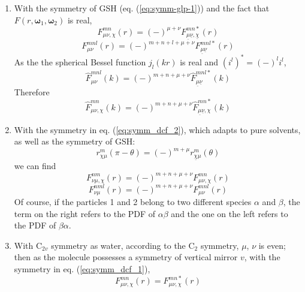 \begin{enumerate}
\item With the symmetry of \acs{GSH} (eq. (\ref{eq:symm-glp-1})) and the
fact that $F(r,\boldsymbol{\omega}_{1},\boldsymbol{\omega}_{2})$
is real,
\begin{equation}
F_{\mu\nu,\chi}^{mn}(r)=\left(-\right)^{\mu+\nu}F_{\underline{\mu}\underline{\nu},\underline{\chi}}^{mn*}(r)
\end{equation}
\begin{equation}
F_{\mu\nu}^{mnl}(r)=\left(-\right)^{m+n+l+\mu+\nu}F_{\underline{\mu}\underline{\nu}}^{mnl*}(r)\label{eq:sym301}
\end{equation}
As the the spherical Bessel function $j_{l}(kr)$ is real and $\left(i^{l}\right)^{*}=\left(-\right)^{l}i^{l}$,
\begin{equation}
\hat{F}_{\mu\nu}^{mnl}(k)=\left(-\right)^{m+n+\mu+\nu}\hat{F}_{\underline{\mu}\underline{\nu}}^{mnl*}(k)\label{eq:rot-invar-symm-k-l}
\end{equation}
Therefore
\begin{equation}
\hat{F}_{\mu\nu,\chi}^{mn}(k)=\left(-\right)^{m+n+\mu+\nu}\hat{F}_{\underline{\mu}\underline{\nu},\chi}^{mn*}(k)\label{eq:rot-invar-symm-k-chi}
\end{equation}
\item With the symmetry in eq. (\ref{eq:symm_dcf_2}), which adapts to pure
solvents, as well as the symmetry of \acs{GSH}:
\begin{equation}
r_{\chi\mu}^{m}(\pi-\theta)=\left(-\right)^{m+\mu}r_{\underline{\chi}\mu}^{m}(\theta)
\end{equation}
we can find
\begin{equation}
F_{\nu\mu,\chi}^{nm}(r)=\left(-\right)^{m+n+\mu+\nu}F_{\mu\nu,\chi}^{mn}(r)
\end{equation}
\begin{equation}
F_{\nu\mu}^{nml}(r)=\left(-\right)^{m+n+\mu+\nu}F_{\mu\nu}^{mnl}(r)
\end{equation}
Of course, if the particles 1 and 2 belong to two different species
$\alpha$ and $\beta$, the term on the right refers to the \acs{PDF}
of $\alpha\beta$ and the one on the left refers to the \acs{PDF} of $\beta\alpha$.
\item With $\mathrm{C}_{2v}$ symmetry as water, according to the $\mathrm{C}_{2}$
symmetry, $\mu$, $\nu$ is even; then as the molecule possesses a
symmetry of vertical mirror $v$, with the symmetry in eq. (\ref{eq:symm_dcf_1}),
\begin{equation}
F_{\mu\nu,\chi}^{mn}(r)=F_{\mu\nu,\chi}^{mn*}(r)

\end{equation}
\end{enumerate}
